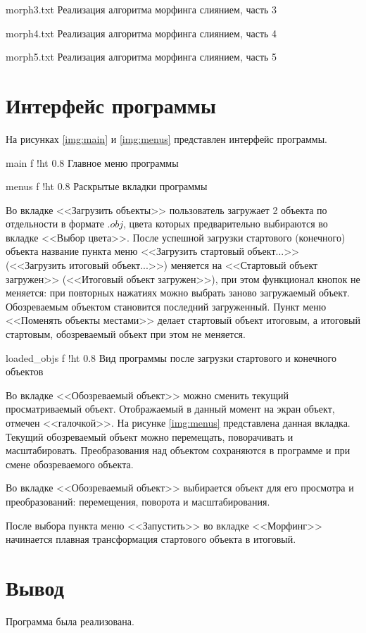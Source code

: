 \clearpage

{morph3.txt}
{Реализация алгоритма морфинга слиянием, часть 3}

\clearpage

{morph4.txt}
{Реализация алгоритма морфинга слиянием, часть 4}

\clearpage

{morph5.txt}
{Реализация алгоритма морфинга слиянием, часть 5}

\clearpage

\section{Интерфейс программы}

На рисунках \ref{img:main} и \ref{img:menus} представлен интерфейс программы.

{main}
{f}
{!ht}
{0.8\textwidth}
{Главное меню программы}

{menus}
{f}
{!ht}
{0.8\textwidth}
{Раскрытые вкладки программы}

Во вкладке <<Загрузить объекты>> пользователь загружает 2 объекта по отдельности в формате $.obj$, цвета которых предварительно выбираются во вкладке <<Выбор цвета>>. После успешной загрузки стартового (конечного) объекта название пункта меню <<Загрузить стартовый объект...>> (<<Загрузить итоговый объект...>>) меняется на <<Стартовый объект загружен>> (<<Итоговый объект загружен>>), при этом функционал кнопок не меняется: при повторных нажатиях можно выбрать заново загружаемый объект. Обозреваемым объектом становится последний загруженный. Пункт меню <<Поменять объекты местами>> делает стартовый объект итоговым, а итоговый стартовым, обозреваемый объект при этом не меняется. 

{loaded_objs}
{f}
{!ht}
{0.8\textwidth}
{Вид программы после загрузки стартового и конечного объектов}

\pagebreak

Во вкладке <<Обозреваемый объект>> можно сменить текущий просматриваемый объект. Отображаемый в данный момент на экран объект, отмечен <<галочкой>>. На рисунке \ref{img:menus} представлена данная вкладка. Текущий обозреваемый объект можно перемещать, поворачивать и масштабировать. Преобразования над объектом сохраняются в программе и при смене обозреваемого объекта.

Во вкладке <<Обозреваемый объект>> выбирается объект для его просмотра и преобразований: перемещения, поворота и масштабирования.

После выбора пункта меню <<Запустить>> во вкладке <<Морфинг>> начинается плавная трансформация стартового объекта в итоговый.

\section*{Вывод}
Программа была реализована.


